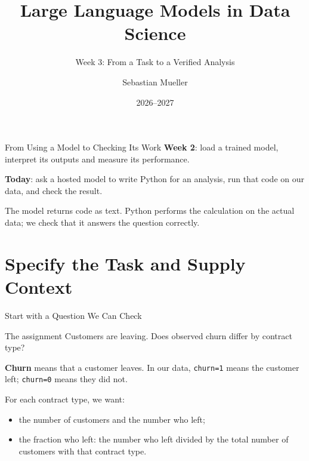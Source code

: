 \documentclass[aspectratio=169]{beamer}
\title{Large Language Models in Data Science}
\subtitle{Week 3: From a Task to a Verified Analysis}
\author{Sebastian Mueller}
\institute{Aix-Marseille Universit\'e}
\date{2026--2027}
\begin{document}
\begin{frame}[plain]\titlepage\end{frame}

\begin{frame}{From Using a Model to Checking Its Work}
  \textbf{Week 2}: load a trained model, interpret its outputs and measure its performance.
  \par\vspace{0.6em}
  \textbf{Today}: ask a hosted model to write Python for an analysis, run that code on our data, and check the result.
  \begin{center}
  \end{center}
  \small The model returns code as text. Python performs the calculation on the actual data; we check that it answers the question correctly.
\end{frame}

\section{Specify the Task and Supply Context}

\begin{frame}{Start with a Question We Can Check}
  \begin{block}{The assignment}
    Customers are leaving. Does observed churn differ by contract type?
  \end{block}
  \textbf{Churn} means that a customer leaves. In our data, \texttt{churn=1} means the customer left; \texttt{churn=0} means they did not.
  \par\vspace{0.5em}
  For each contract type, we want:
  \begin{itemize}
    \item the number of customers and the number who left;
    \item the fraction who left: the number who left divided by the total number of customers with that contract type.
  \end{itemize}
\end{frame}
\end{document}
